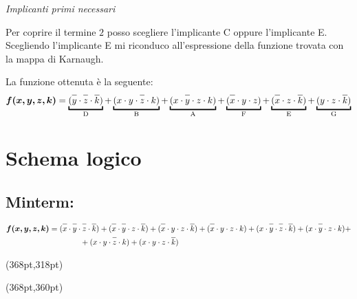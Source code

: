 \documentclass{article}
\newcommand*{\oline}[1]{\overline{#1\mathstrut}}
\newcommand{\bigspace}{\quad\quad\quad\quad}
\begin{document}
\begin{table}[!htb]
\begin{minipage}{.5\linewidth}
      \bigskip

      \textit{\small{Implicanti primi necessari}}
  \end{minipage}
\end{table}

Per coprire il termine $2$ posso scegliere l'implicante C oppure l'implicante E. Scegliendo l'implicante E mi riconduco all'espressione della funzione trovata con la mappa di Karnaugh.

La funzione ottenuta è la seguente:
\begin{align*}
  \bm{f(x,y,z,k)} = \underbracket{(\oline{y} \cdot \oline{z} \cdot \oline{k})}_{\text{D}} + \underbracket{(x \cdot y \cdot \oline{z} \cdot k)}_{\text{B}} + \underbracket{(x \cdot \oline{y} \cdot z \cdot k)}_{\text{A}} + \underbracket{(\oline{x} \cdot y \cdot z)}_{\text{F}} + \underbracket{(\oline{x} \cdot z \cdot \oline{k})}_{\text{E}} + \underbracket{(y \cdot z \cdot \oline{k})}_{\text{G}}
\end{align*}

\newpage

\section{Schema logico}

\bigskip

\subsection*{Minterm:}

\begin{align*}
  \bm{f(x,y,z,k)} &= (\oline{x} \cdot \oline{y} \cdot \oline{z} \cdot \oline{k}) + (\oline{x} \cdot \oline{y} \cdot z \cdot \oline{k}) + (\oline{x} \cdot y \cdot z \cdot \oline{k}) + (\oline{x} \cdot y \cdot z \cdot k) + (x \cdot \oline{y} \cdot \oline{z} \cdot \oline{k}) + (x \cdot \oline{y} \cdot z \cdot k) + \\
  &\bigspace + (x \cdot y \cdot \oline{z} \cdot k) + (x \cdot y \cdot z \cdot \oline{k})
\end{align*}


\begin{textblock*}{10pt}(368pt,318pt)
  \scalebox{0.5}{$(\oline{x} \cdot \oline{y} \cdot \oline{z} \cdot \oline{k})$}
\end{textblock*}

\begin{textblock*}{10pt}(368pt,360pt)
  \scalebox{0.5}{$(\oline{x} \cdot \oline{y} \cdot z \cdot \oline{k})$}
\end{textblock*}
\end{document}
